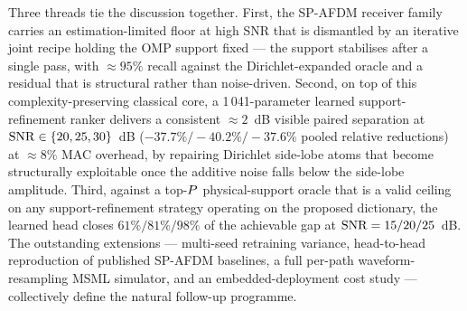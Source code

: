 Three threads tie the discussion together. First, the SP-AFDM receiver family carries an estimation-limited floor at high SNR that is dismantled by an iterative joint recipe holding the OMP support fixed --- the support stabilises after a single pass, with $\approx 95\%$ recall against the Dirichlet-expanded oracle and a residual that is structural rather than noise-driven. Second, on top of this complexity-preserving classical core, a 1\,041-parameter learned support-refinement ranker delivers a consistent $\approx 2$~dB visible paired separation at $\mathrm{SNR} \in \{20, 25, 30\}$~dB ($-37.7\%/-40.2\%/-37.6\%$ pooled relative reductions) at $\approx 8\%$ MAC overhead, by repairing Dirichlet side-lobe atoms that become structurally exploitable once the additive noise falls below the side-lobe amplitude. Third, against a top-$P$ physical-support oracle that is a valid ceiling on any support-refinement strategy operating on the proposed dictionary, the learned head closes $61\%/81\%/98\%$ of the achievable gap at $\mathrm{SNR} = 15/20/25$~dB. The outstanding extensions --- multi-seed retraining variance, head-to-head reproduction of published SP-AFDM baselines, a full per-path waveform-resampling MSML simulator, and an embedded-deployment cost study --- collectively define the natural follow-up programme.
